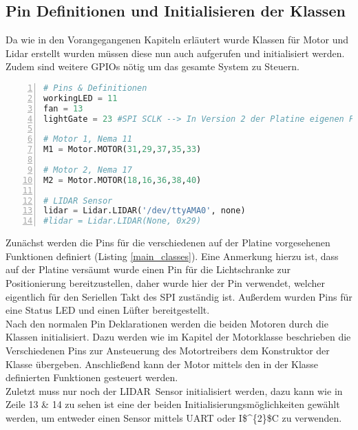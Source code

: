 \subsection{Pin Definitionen und Initialisieren der Klassen}
Da wie in den Vorangegangenen Kapiteln erläutert wurde Klassen für Motor und Lidar erstellt wurden müssen diese nun auch aufgerufen und initialisiert werden. Zudem sind weitere \acp{GPIO} nötig um das gesamte System zu Steuern.
\begin{lstlisting}[caption={Initialisieren von Variablen und Klassen}, language={Python}, label={main_classes}, numbers=left]
# Pins & Definitionen
workingLED = 11
fan = 13
lightGate = 23 #SPI SCLK --> In Version 2 der Platine eigenen Pin zuweisen

# Motor 1, Nema 11
M1 = Motor.MOTOR(31,29,37,35,33)

# Motor 2, Nema 17
M2 = Motor.MOTOR(18,16,36,38,40)

# LIDAR Sensor
lidar = Lidar.LIDAR('/dev/ttyAMA0', none)
#lidar = Lidar.LIDAR(None, 0x29)
\end{lstlisting}
Zunächst werden die Pins für die verschiedenen auf der Platine vorgesehenen Funktionen definiert (Listing \ref{main_classes}). Eine Anmerkung hierzu ist, dass auf der Platine versäumt wurde einen Pin für die Lichtschranke zur Positionierung bereitzustellen, daher wurde hier der Pin verwendet, welcher eigentlich für den Seriellen Takt des \ac{SPI} zuständig ist. Außerdem wurden Pins für eine Status LED und einen Lüfter bereitgestellt. \\
Nach den normalen Pin Deklarationen werden die beiden Motoren durch die Klassen initialisiert. Dazu werden wie im Kapitel der Motorklasse beschrieben die Verschiedenen Pins zur Ansteuerung des Motortreibers dem Konstruktor der Klasse übergeben. Anschließend kann der Motor mittels den in der Klasse definierten Funktionen gesteuert werden.\\
Zuletzt muss nur noch der \ac{LIDAR} Sensor initialisiert werden, dazu kann wie in Zeile 13 \& 14 zu sehen ist eine der beiden Initialisierungsmöglichkeiten gewählt werden, um entweder einen Sensor mittels \ac{UART} oder \ac{I$^{2}$C} zu verwenden.\\
